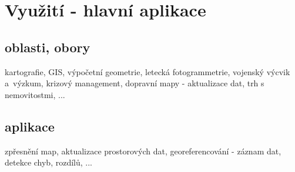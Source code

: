 \section{Využití - hlavní aplikace}
\label{využití}

\subsection{oblasti, obory}
\label{obory}
kartografie, GIS, výpočetní geometrie, letecká fotogrammetrie, vojenský výcvik 
a~výzkum, krizový management, dopravní mapy - aktualizace dat, trh s nemovitostmi, ...

\subsection{aplikace}
\label{aplikace}
zpřesnění map, aktualizace prostorových dat, georeferencování - záznam dat, detekce 
chyb, rozdílů, ...

